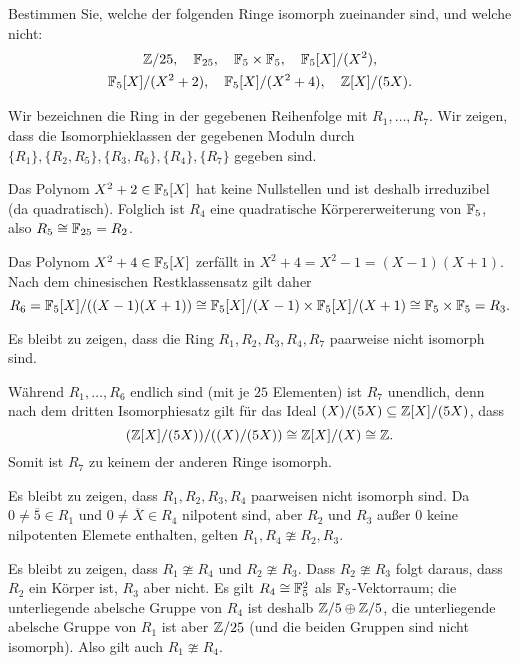  \begin{question}
  Bestimmen Sie, welche der folgenden Ringe isomorph zueinander sind, und welche nicht:
  \begin{gather*}
    \mathbb{Z}/25,
    \quad
    \mathbb{F}_{25},
    \quad
    \mathbb{F}_5 \times \mathbb{F}_5,
    \quad
    \mathbb{F}_5[X]/(X^2),
    \\
    \mathbb{F}_5[X]/(X^2+2),
    \quad
    \mathbb{F}_5[X]/(X^2+4),
    \quad
    \mathbb{Z}[X]/(5X).
  \end{gather*}
\end{question}


\begin{solution}
  Wir bezeichnen die Ring in der gegebenen Reihenfolge mit $R_1, \dotsc, R_7$.
  Wir zeigen, dass die Isomorphieklassen der gegebenen Moduln durch $\{R_1\}, \{R_2, R_5\}, \{R_3, R_6\}, \{R_4\}, \{R_7\}$ gegeben sind.
  
  Das Polynom $X^2 + 2 \in \mathbb{F}_5[X]$ hat keine Nullstellen und ist deshalb irreduzibel (da quadratisch).
  Folglich ist $R_4$ eine quadratische Körpererweiterung von $\mathbb{F}_5$, also $R_5 \cong \mathbb{F}_{25} = R_2$.
  
  Das Polynom $X^2 + 4 \in \mathbb{F}_5[X]$ zerfällt in $X^2 + 4 = X^2 - 1 = (X-1)(X+1)$.
  Nach dem chinesischen Restklassensatz gilt daher
  \[
          R_6
    =     \mathbb{F}_5[X]/((X-1)(X+1))
    \cong \mathbb{F}_5[X]/(X-1) \times \mathbb{F}_5[X]/(X+1)
    \cong \mathbb{F}_5 \times \mathbb{F}_5
    =     R_3.
  \]
  
  Es bleibt zu zeigen, dass die Ring $R_1, R_2, R_3, R_4, R_7$ paarweise nicht isomorph sind.
  
  Während $R_1, \dotsc, R_6$ endlich sind (mit je $25$ Elementen) ist $R_7$ unendlich, denn nach dem dritten Isomorphiesatz gilt für das Ideal $(X)/(5X) \subseteq \mathbb{Z}[X]/(5X)$, dass
  \[
           (\mathbb{Z}[X]/(5X))/((X)/(5X))
    \cong \mathbb{Z}[X]/(X)
    \cong \mathbb{Z}.
  \]
  Somit ist $R_7$ zu keinem der anderen Ringe isomorph.
  
  Es bleibt zu zeigen, dass $R_1, R_2, R_3, R_4$ paarweisen nicht isomorph sind.
  Da $0 \neq \overline{5} \in R_1$ und $0 \neq \overline{X} \in R_4$ nilpotent sind, aber $R_2$ und $R_3$ außer $0$ keine nilpotenten Elemete enthalten, gelten $R_1, R_4 \ncong R_2, R_3$.
  
  Es bleibt zu zeigen, dass $R_1 \ncong R_4$ und $R_2 \ncong R_3$.
  Dass $R_2 \ncong R_3$ folgt daraus, dass $R_2$ ein Körper ist, $R_3$ aber nicht.
  Es gilt $R_4 \cong \mathbb{F}_5^2$ als $\mathbb{F}_5$-Vektorraum;
  die unterliegende abelsche Gruppe von $R_4$ ist deshalb $\mathbb{Z}/5 \oplus \mathbb{Z}/5$, die unterliegende abelsche Gruppe von $R_1$ ist aber $\mathbb{Z}/25$ (und die beiden Gruppen sind nicht isomorph).
  Also gilt auch $R_1 \ncong R_4$.
\end{solution}


